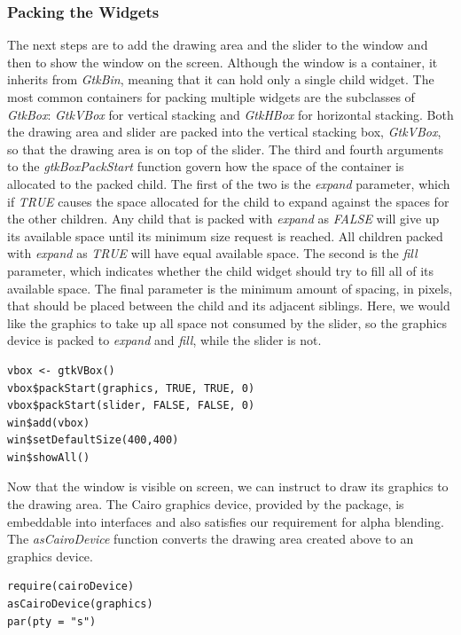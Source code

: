 \documentclass[article]{jss}
\begin{document}
\subsubsection{Packing the Widgets}

The next steps are to add the drawing area and the slider to the
window and then to show the window on the screen. Although the window is a
container, it inherits from \emph{GtkBin}, meaning that it can hold only
a single child widget. The most common containers for packing multiple widgets
are the subclasses of \emph{GtkBox}: \emph{GtkVBox} for vertical stacking and
\emph{GtkHBox} for horizontal stacking. Both the drawing
area and slider are packed into the vertical stacking box,
\emph{GtkVBox}, so that the drawing area is on top of the slider. The third and 
fourth arguments to the \emph{gtkBoxPackStart} function govern how the
space of the container is allocated to the packed child. The first of the two
is the \emph{expand} parameter, which if \emph{TRUE} causes the space allocated
for the child to expand against the spaces for the other children. Any child
that is packed with \emph{expand} as \emph{FALSE} will give up its available
space until its minimum size request is reached. All children packed with
\emph{expand} as \emph{TRUE} will have equal available space. The second is
the \emph{fill} parameter, which indicates whether the child widget should try to
fill all of its available space. The final parameter is the minimum amount of 
spacing, in pixels, that should be placed between the child and its adjacent siblings.
Here, we would like the graphics to take up all space not consumed by the slider,
so the graphics device is packed to \emph{expand} and \emph{fill}, while the
slider is not.
\begin{verbatim}
vbox <- gtkVBox()
vbox$packStart(graphics, TRUE, TRUE, 0)
vbox$packStart(slider, FALSE, FALSE, 0)
win$add(vbox)
win$setDefaultSize(400,400)
win$showAll() 
\end{verbatim}

Now that the window is visible on screen, we can instruct  to draw
its graphics to the drawing area. The Cairo graphics device, provided by the
 package, is embeddable
into  interfaces and also satisfies our requirement for alpha
blending. The \emph{asCairoDevice} function
converts the drawing area created above to an  graphics device. 
\begin{verbatim}
require(cairoDevice)
asCairoDevice(graphics)
par(pty = "s")
\end{verbatim}
\end{document}
